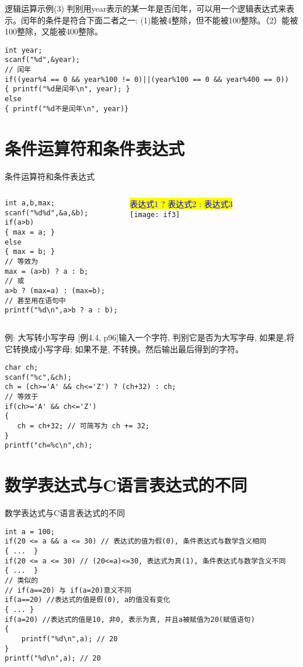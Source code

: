 \begin{frame}{逻辑运算示例(3)}
判别用year表示的某一年是否闰年，可以用一个逻辑表达式来表示。闰年的条件是符合下面二者之一: (1)能被4整除，但不能被100整除。（2）能被100整除，又能被400整除。
\begin{lstlisting}
int year;
scanf("%d",&year);
// 闰年
if((year%4 == 0 && year%100 != 0)||(year%100 == 0 && year%400 == 0))
{ printf("%d是闰年\n", year); }
else
{ printf("%d不是闰年\n", year)}
\end{lstlisting}
\end{frame}

\section{条件运算符和条件表达式}

\begin{frame}{条件运算符和条件表达式}
\begin{columns}[T]
\begin{lstlisting}
int a,b,max;
scanf("%d%d",&a,&b);
if(a>b)
{ max = a; }
else
{ max = b; }
// 等效为
max = (a>b) ? a : b;
// 或
a>b ? (max=a) : (max=b);
// 甚至用在语句中
printf("%d\n",a>b ? a : b);
\end{lstlisting}
\colorbox{yellow}{\textcolor{blue}{表达式1 ? 表达式2 : 表达式3}}\\
\texttt{[image: if3]}
\end{columns}
\end{frame}

\begin{frame}{例: 大写转小写字母}
[例4.4, p96]输入一个字符, 判别它是否为大写字母, 如果是,将它转换成小写字母; 如果不是, 不转换。然后输出最后得到的字符。
\begin{lstlisting}
char ch;
scanf("%c",&ch);
ch = (ch>='A' && ch<='Z') ? (ch+32) : ch;
// 等效于
if(ch>='A' && ch<='Z')
{
   ch = ch+32; // 可简写为 ch += 32;
}
printf("ch=%c\n",ch);
\end{lstlisting}
\end{frame}

\section{数学表达式与C语言表达式的不同}

\begin{frame}{数学表达式与C语言表达式的不同}
\begin{lstlisting}
int a = 100;
if(20 <= a && a <= 30) // 表达式的值为假(0), 条件表达式与数学含义相同
{ ...  }
if(20 <= a <= 30) // (20<=a)<=30, 表达式为真(1), 条件表达式与数学含义不同
{ ...  }
// 类似的
// if(a==20) 与 if(a=20)意义不同
if(a==20) //表达式的值是假(0), a的值没有变化
{ ... }
if(a=20) //表达式的值是10, 非0, 表示为真, 并且a被赋值为20(赋值语句)
{
    printf("%d\n",a); // 20 
}
printf("%d\n",a); // 20 
\end{lstlisting}
\end{frame}

